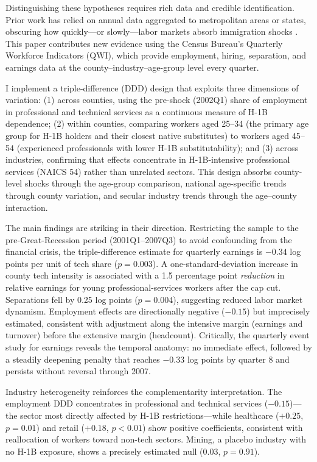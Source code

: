 \documentclass[12pt]{article}
\begin{document}
Distinguishing these hypotheses requires rich data and credible identification. Prior work has relied on annual data aggregated to metropolitan areas or states, obscuring how quickly---or slowly---labor markets absorb immigration shocks \citep{borjas2017labor, peri2015stem, doran2022high}. This paper contributes new evidence using the Census Bureau's Quarterly Workforce Indicators (QWI), which provide employment, hiring, separation, and earnings data at the county--industry--age-group level every quarter.

I implement a triple-difference (DDD) design that exploits three dimensions of variation: (1) across counties, using the pre-shock (2002Q1) share of employment in professional and technical services as a continuous measure of H-1B dependence; (2) within counties, comparing workers aged 25--34 (the primary age group for H-1B holders and their closest native substitutes) to workers aged 45--54 (experienced professionals with lower H-1B substitutability); and (3) across industries, confirming that effects concentrate in H-1B-intensive professional services (NAICS 54) rather than unrelated sectors. This design absorbs county-level shocks through the age-group comparison, national age-specific trends through county variation, and secular industry trends through the age--county interaction.

The main findings are striking in their direction. Restricting the sample to the pre-Great-Recession period (2001Q1--2007Q3) to avoid confounding from the financial crisis, the triple-difference estimate for quarterly earnings is $-0.34$ log points per unit of tech share ($p = 0.003$). A one-standard-deviation increase in county tech intensity is associated with a 1.5 percentage point \textit{reduction} in relative earnings for young professional-services workers after the cap cut. Separations fell by 0.25 log points ($p = 0.004$), suggesting reduced labor market dynamism. Employment effects are directionally negative ($-0.15$) but imprecisely estimated, consistent with adjustment along the intensive margin (earnings and turnover) before the extensive margin (headcount). Critically, the quarterly event study for earnings reveals the temporal anatomy: no immediate effect, followed by a steadily deepening penalty that reaches $-0.33$ log points by quarter 8 and persists without reversal through 2007.

Industry heterogeneity reinforces the complementarity interpretation. The employment DDD concentrates in professional and technical services ($-0.15$)---the sector most directly affected by H-1B restrictions---while healthcare ($+0.25$, $p = 0.01$) and retail ($+0.18$, $p < 0.01$) show positive coefficients, consistent with reallocation of workers toward non-tech sectors. Mining, a placebo industry with no H-1B exposure, shows a precisely estimated null ($0.03$, $p = 0.91$).
\end{document}
